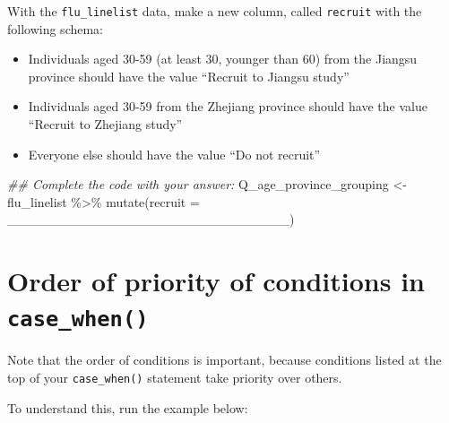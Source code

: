 \documentclass[
  letterpaper,
  DIV=11,
  numbers=noendperiod]{scrreprt}
\newenvironment{Shaded}{\begin{snugshade}}{\end{snugshade}}
\newcommand{\AttributeTok}[1]{\textcolor[rgb]{0.40,0.45,0.13}{#1}}
\newcommand{\DocumentationTok}[1]{\textcolor[rgb]{0.37,0.37,0.37}{\textit{#1}}}
\newcommand{\FunctionTok}[1]{\textcolor[rgb]{0.28,0.35,0.67}{#1}}
\newcommand{\NormalTok}[1]{\textcolor[rgb]{0.00,0.23,0.31}{#1}}
\newcommand{\OtherTok}[1]{\textcolor[rgb]{0.00,0.23,0.31}{#1}}
\newcommand{\SpecialCharTok}[1]{\textcolor[rgb]{0.37,0.37,0.37}{#1}}
\providecommand{\tightlist}{%
  \setlength{\itemsep}{0pt}\setlength{\parskip}{0pt}}\usepackage{longtable,booktabs,array}
\begin{document}
\begin{tcolorbox}[enhanced jigsaw, title=\textcolor{quarto-callout-tip-color}{\faLightbulb}\hspace{0.5em}{Practice}, colbacktitle=quarto-callout-tip-color!10!white, leftrule=.75mm, arc=.35mm, opacityback=0, bottomrule=.15mm, rightrule=.15mm, toptitle=1mm, breakable, toprule=.15mm, colback=white, coltitle=black, colframe=quarto-callout-tip-color-frame, bottomtitle=1mm, titlerule=0mm, left=2mm, opacitybacktitle=0.6]

With the \texttt{flu\_linelist} data, make a new column, called
\texttt{recruit} with the following schema:

\begin{itemize}
\tightlist
\item
  Individuals aged 30-59 (at least 30, younger than 60) from the Jiangsu
  province should have the value ``Recruit to Jiangsu study''
\item
  Individuals aged 30-59 from the Zhejiang province should have the
  value ``Recruit to Zhejiang study''
\item
  Everyone else should have the value ``Do not recruit''
\end{itemize}

\begin{Shaded}
\begin{Highlighting}[]
\DocumentationTok{\#\# Complete the code with your answer:}
\NormalTok{Q\_age\_province\_grouping }\OtherTok{\textless{}{-}} 
\NormalTok{  flu\_linelist }\SpecialCharTok{\%\textgreater{}\%} 
  \FunctionTok{mutate}\NormalTok{(}\AttributeTok{recruit =}\NormalTok{ \_\_\_\_\_\_\_\_\_\_\_\_\_\_\_\_\_\_\_\_\_\_\_\_\_\_\_\_\_\_)}
\end{Highlighting}
\end{Shaded}

\end{tcolorbox}

\section{\texorpdfstring{Order of priority of conditions in
\texttt{case\_when()}}{Order of priority of conditions in case\_when()}}\label{order-of-priority-of-conditions-in-case_when}

Note that the order of conditions is important, because conditions
listed at the top of your \texttt{case\_when()} statement take priority
over others.

To understand this, run the example below:
\end{document}
